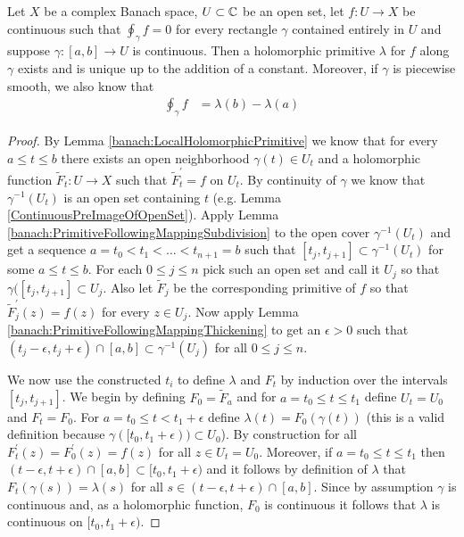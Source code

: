 \begin{prop}\label{banach:HolomorphicPrimitive}Let $X$ be a complex Banach space, $U \subset \mathbb{C}$ be an open set, let $f: U \to X$ be continuous such that $\oint_\gamma f = 0$ for every rectangle $\gamma$ contained entirely in $U$ and suppose $\gamma : [a,b] \to U$ is continuous.   Then a holomorphic primitive $\lambda$ for $f$ along $\gamma$ exists and is unique up to the addition of a constant.
  Moreover, if $\gamma$ is piecewise smooth, we also know that
  \begin{align*}
    \oint_{\gamma} f &= \lambda(b) - \lambda(a)
  \end{align*}
\end{prop}
\begin{proof}
  By Lemma \ref{banach:LocalHolomorphicPrimitive} we know that for every $a \leq t \leq b$ there exists an open neighborhood $\gamma(t) \in U_t$ and a holomorphic function $\tilde{F}_t : U \to X$ such that $\tilde{F}^\prime_t = f$ on $U_t$.   By continuity of $\gamma$ we know that $\gamma^{-1}(U_t)$ is an open set containing $t$ (e.g. Lemma \ref{ContinuousPreImageOfOpenSet}).   Apply Lemma \ref{banach:PrimitiveFollowingMappingSubdivision} to the open cover $\gamma^{-1}(U_t)$ and get a sequence $a=t_0 < t_1 < \dotsc < t_{n+1} =b$ such that $[t_j, t_{j+1}] \subset \gamma^{-1}(U_t)$ for some $a \leq t \leq b$.   For each $0 \leq j \leq n$ pick such an open set and call it $U_j$ so that $\gamma([t_j, t_{j+1}] \subset U_{j}$.  Also let $\tilde{F}_j$ be the corresponding primitive of $f$ so that $\tilde{F}^\prime_j (z) = f(z)$ for every $z \in U_j$.   Now apply Lemma \ref{banach:PrimitiveFollowingMappingThickening} to get an $\epsilon > 0$ such that $(t_j - \epsilon, t_j + \epsilon) \cap [a,b] \subset \gamma^{-1}(U_j)$ for all $0 \leq j \leq n$.

  We now use the constructed $t_i$ to define $\lambda$ and $F_{t}$ by induction over the intervals $[t_j, t_{j+1}]$.
 We begin by defining
$F_{0} =  \tilde{F}_{a}$  and for $a=t_0 \leq t \leq t_1$ define $U_t = U_{0}$ and $F_t = F_0$.   For $a=t_0 \leq t < t_1 + \epsilon$ define
$\lambda(t) = F_0(\gamma(t))$ (this is a valid definition because $\gamma([t_0, t_1+\epsilon) ) \subset U_0$).  By construction for all
$F^\prime_{t} (z) = F^\prime_{0} (z) = f(z)$ for all $z \in U_t = U_0$.  Moreover, if $a=t_0 \leq t \leq t_1$ then $(t - \epsilon, t + \epsilon) \cap [a,b] \subset [t_0, t_1 + \epsilon)$
and it follows by definition of $\lambda$ that $F_t(\gamma(s)) = \lambda(s)$ for all $s \in (t - \epsilon, t + \epsilon) \cap [a,b]$.
Since by assumption $\gamma$ is continuous and, as a holomorphic function, $F_{0}$ is continuous it follows that $\lambda$ is continuous on $[t_0, t_1+\epsilon)$.


\end{proof}
